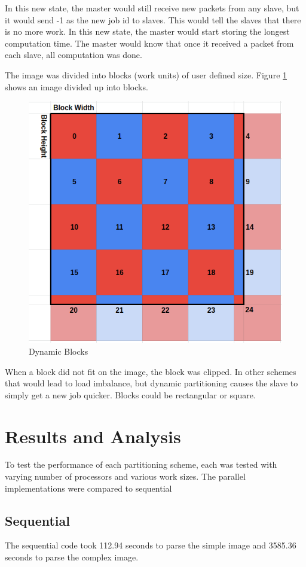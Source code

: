 \documentclass[11pt]{article}
\begin{document}
		In this new state, the master would still receive new packets from any slave, but it would send -1 as the new job id to slaves. This would tell the slaves that there is no more work. In this new state, the master would start storing the longest computation time. The master would know that once it received a packet from each slave, all computation was done. 
		
		 The image was divided into blocks (work units) of user defined size. Figure \ref{fig:dynamic} shows an image divided up into blocks.
		
		\begin{figure}[H]
			\centering
			\includegraphics[width=0.7\linewidth]{Pictures/Dynamic}
			\caption{Dynamic Blocks}
			\label{fig:dynamic}
		\end{figure}
	
		When a block did not fit on the image, the block was clipped. In other schemes that would lead to load imbalance, but dynamic partitioning causes the slave to simply get a new job quicker. Blocks could be rectangular or square. 
	
\section{Results and Analysis}

	To test the performance of each partitioning scheme, each was tested with varying number of processors and various work sizes. The parallel implementations were compared to sequential 

	\subsection{Sequential}
		The sequential code took 112.94 seconds to parse the simple image and 3585.36 seconds to parse the complex image. 
		
\end{document}
